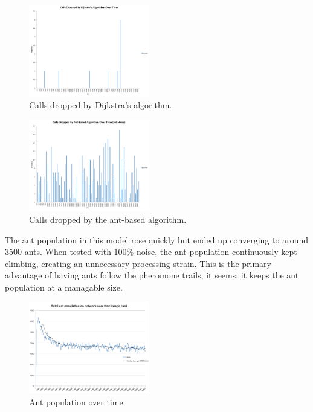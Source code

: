 \begin{figure}[!h]

  \centering
  \includegraphics[width=0.47\textwidth]{figs/dijk_hist.jpg}
  \caption{Calls dropped by Dijkstra's algorithm.}
  \label{fig:dijk_hist}

\end{figure}

\begin{figure}[htb]

  \centering
  \includegraphics[width=0.47\textwidth]{figs/ant_hist.jpg}
  \caption{Calls dropped by the ant-based algorithm.}
  \label{fig:ant_hist}

\end{figure}

The ant population in this model rose quickly but ended up converging to around 3500 ants. When tested with 100\% noise, the ant population continuously kept climbing, creating an unnecessary processing strain. This is the primary advantage of having ants follow the pheromone trails, it seems; it keeps the ant population at a managable size.

\begin{figure}[htb]

  \centering
  \includegraphics[width=0.47\textwidth]{figs/ant_pop.jpg}
  \caption{Ant population over time.}
  \label{fig:btc}

\end{figure}